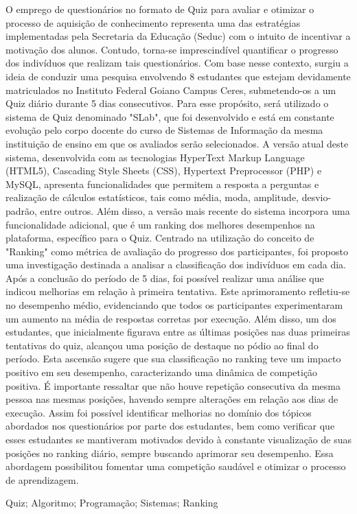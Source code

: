 \documentclass{modelo_resumo_simples}
\begin{document}
	
	\construirtitulo

	\construirautores
	
	\begin{resumo}
	O emprego de questionários no formato de Quiz para avaliar e otimizar o processo de aquisição de conhecimento representa uma das estratégias implementadas pela Secretaria da Educação (Seduc) com o intuito de incentivar a motivação dos alunos. Contudo, torna-se imprescindível quantificar o progresso dos indivíduos que realizam tais questionários. Com base nesse contexto, surgiu a ideia de conduzir uma pesquisa envolvendo 8 estudantes que estejam devidamente matriculados no Instituto Federal Goiano Campus Ceres, submetendo-os a um Quiz diário durante 5 dias consecutivos. Para esse propósito, será utilizado o sistema de Quiz denominado "SLab", que foi desenvolvido e está em constante evolução pelo corpo docente do curso de Sistemas de Informação da mesma instituição de ensino em que os avaliados serão selecionados. A versão atual deste sistema, desenvolvida com as tecnologias HyperText Markup Language (HTML5), Cascading Style Sheets (CSS), Hypertext Preprocessor (PHP) e MySQL, apresenta funcionalidades que permitem a resposta a perguntas e realização de cálculos estatísticos, tais como média, moda, amplitude, desvio-padrão, entre outros. Além disso, a versão mais recente do sistema incorpora uma funcionalidade adicional, que é um ranking dos melhores desempenhos na plataforma, específico para o Quiz. Centrado na utilização do conceito de "Ranking" como métrica de avaliação do progresso dos participantes, foi proposto uma investigação destinada a analisar a classificação dos indivíduos em cada dia. Após a conclusão do período de 5 dias, foi possível realizar uma análise que indicou melhorias em relação à primeira tentativa. Este aprimoramento refletiu-se no desempenho médio, evidenciando que todos os participantes experimentaram um aumento na média de respostas corretas por execução. Além disso, um dos estudantes, que inicialmente figurava entre as últimas posições nas duas primeiras tentativas do quiz, alcançou uma posição de destaque no pódio ao final do período. Esta ascensão sugere que sua classificação no ranking teve um impacto positivo em seu desempenho, caracterizando uma dinâmica de competição positiva. É importante ressaltar que não houve repetição consecutiva da mesma pessoa nas mesmas posições, havendo sempre alterações em relação aos dias de execução. Assim foi possível identificar melhorias no domínio dos tópicos abordados nos questionários por parte dos estudantes, bem como verificar que esses estudantes se mantiveram motivados devido à constante visualização de suas posições no ranking diário, sempre buscando aprimorar seu desempenho. Essa abordagem possibilitou fomentar uma competição saudável e otimizar o processo de aprendizagem.
	\end{resumo}
	
	\begin{palavras_chave}
	Quiz; Algoritmo; Programação; Sistemas; Ranking
	\end{palavras_chave}
\end{document}
